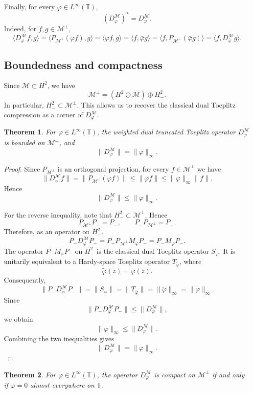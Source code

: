 \documentclass[10pt,a4paper]{amsart}
\newtheorem{theorem}{Theorem}[section]
\def \T{\mathbb{T}}
\newcommand{\clm}{\mathcal{M}}
\newcommand{\vp}{\varphi}
\numberwithin{equation}{section}
\begin{document}
Finally, for every $\vp\in L^\infty(\T)$,
\[
(D_\vp^{\clm})^*=D_{\bar\vp}^{\clm}.
\]
Indeed, for $f,g\in\clm^\perp$,
\[
\langle D_\vp^{\clm}f,g\rangle
=
\langle P_{\clm^\perp}(\vp f),g\rangle
=
\langle \vp f,g\rangle
=
\langle f,\bar\vp g\rangle
=
\langle f,P_{\clm^\perp}(\bar\vp g)\rangle
=
\langle f,D_{\bar\vp}^{\clm}g\rangle .
\]

\subsection{Boundedness and compactness}

Since $\clm\subset H^2$, we have
\[
\clm^\perp=(H^2\ominus \clm)\oplus H^2_{-}.
\]
In particular, $H_{-}^2\subset \clm^\perp$. This allows us to recover the classical dual Toeplitz compression as a corner of $D_\vp^\clm$.

\begin{theorem}\label{thm:boundedness}
For $\vp\in L^\infty(\T)$, the weighted dual truncated Toeplitz operator $D_\vp^\clm$ is bounded on $\clm^\perp$, and
\[
\|D_\vp^\clm\|=\|\vp\|_\infty .
\]
\end{theorem}

\begin{proof}
Since $P_{\clm^\perp}$ is an orthogonal projection, for every
$f\in\clm^\perp$ we have
\[
\|D_\vp^\clm f\|
=
\|P_{\clm^\perp}(\vp f)\|
\leq
\|\vp f\|
\leq
\|\vp\|_\infty\|f\|.
\]
Hence
\[
\|D_\vp^\clm\|\leq \|\vp\|_\infty.
\]

For the reverse inequality, note that $H_{-}^2\subset\clm^\perp$. Hence
\[
P_{\clm^\perp}P_{-}=P_{-},
\qquad
P_{-}P_{\clm^\perp}=P_{-}.
\]
Therefore, as an operator on $H_{-}^2$,
\[
P_{-}D_\vp^\clm P_{-}
=
P_{-}P_{\clm^\perp}M_\vp P_{-}
=
P_{-}M_\vp P_{-}.
\]
The operator $P_{-}M_\vp P_{-}$ on $H_{-}^2$ is the classical dual Toeplitz operator $S_\vp$. It is unitarily equivalent to a Hardy-space Toeplitz operator $T_{\widetilde{\vp}}$, where
\[
\widetilde{\vp}(z)=\vp(\bar{z}).
\]
Consequently,
\[
\|P_{-}D_\vp^\clm P_{-}\|
=
\|S_\vp\|
=
\|T_{\widetilde{\vp}}\|
=
\|\widetilde{\vp}\|_\infty
=
\|\vp\|_\infty.
\]
Since
\[
\|P_{-}D_\vp^\clm P_{-}\|\leq \|D_\vp^\clm\|,
\]
we obtain
\[
\|\vp\|_\infty\leq \|D_\vp^\clm\|.
\]
Combining the two inequalities gives
\[
\|D_\vp^\clm\|=\|\vp\|_\infty.
\]
\end{proof}

\begin{theorem}\label{thm:compactness}
For $\vp\in L^\infty(\T)$, the operator $D_\vp^\clm$ is compact on
$\clm^\perp$ if and only if $\vp=0$ almost everywhere on $\T$.
\end{theorem}
\end{document}

